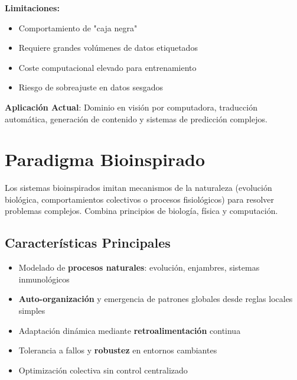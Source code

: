 \documentclass[14pt]{extarticle}
\begin{document}
  \textbf{Limitaciones:}
  \begin{itemize}
    \item Comportamiento de "caja negra"
    \item Requiere grandes volúmenes de datos etiquetados
    \item Coste computacional elevado para entrenamiento
    \item Riesgo de sobreajuste en datos sesgados
  \end{itemize}

  \textbf{Aplicación Actual}: Dominio en visión por computadora, traducción automática, generación de contenido y sistemas de predicción complejos.

  \section*{Paradigma Bioinspirado}

  Los sistemas bioinspirados imitan mecanismos de la naturaleza (evolución biológica, comportamientos colectivos o procesos fisiológicos) para resolver problemas complejos. Combina principios de biología, física y computación.

  \subsection*{Características Principales}
  \begin{itemize}
    \item Modelado de \textbf{procesos naturales}: evolución, enjambres, sistemas inmunológicos
    \item \textbf{Auto-organización} y emergencia de patrones globales desde reglas locales simples
    \item Adaptación dinámica mediante \textbf{retroalimentación} continua
    \item Tolerancia a fallos y \textbf{robustez} en entornos cambiantes
    \item Optimización colectiva sin control centralizado
  \end{itemize}
\end{document}
